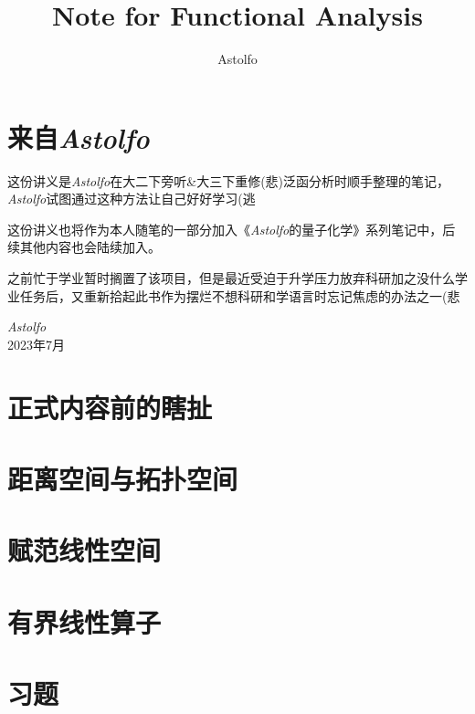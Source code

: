 \documentclass[lang=cn,10pt]{elegantbook}
\title{Note for Functional Analysis}
\author{Astolfo}
\begin{document}
\maketitle
\frontmatter


\mainmatter

\chapter*{来自\textit{Astolfo}}
\setcounter{page}{1}
这份讲义是\textit{Astolfo}在大二下旁听\&大三下重修(悲)泛函分析时顺手整理的笔记，\textit{Astolfo}试图通过这种方法让自己好好学习(逃

这份讲义也将作为本人随笔的一部分加入《\textit{Astolfo}的量子化学》系列笔记中，后续其他内容也会陆续加入。

之前忙于学业暂时搁置了该项目，但是最近受迫于升学压力放弃科研加之没什么学业任务后，又重新拾起此书作为摆烂不想科研和学语言时忘记焦虑的办法之一(悲
\begin{flushright}
    \textit{Astolfo} \\ 2023年7月
\end{flushright}
\tableofcontents
\thispagestyle{empty}
\newpage
\setcounter{page}{1}
\chapter{正式内容前的瞎扯}

\chapter{距离空间与拓扑空间}

\chapter{赋范线性空间}

\chapter{有界线性算子}

\chapter{习题}

\end{document}
